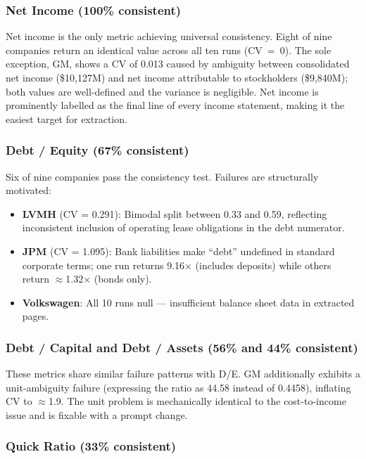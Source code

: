 \documentclass[12pt, a4paper]{article}
\begin{document}
\subsubsection{Net Income (100\% consistent)}

Net income is the only metric achieving universal consistency.  Eight of nine
companies return an identical value across all ten runs (CV~=~0).  The sole
exception, GM, shows a CV of 0.013 caused by ambiguity between consolidated
net income (\$10{,}127M) and net income attributable to stockholders
(\$9{,}840M); both values are well-defined and the variance is negligible.
Net income is prominently labelled as the final line of every income statement,
making it the easiest target for extraction.

\subsubsection{Debt / Equity (67\% consistent)}

Six of nine companies pass the consistency test.  Failures are structurally
motivated:
\begin{itemize}[noitemsep]
  \item \textbf{LVMH} (CV = 0.291): Bimodal split between 0.33 and 0.59,
        reflecting inconsistent inclusion of operating lease obligations in
        the debt numerator.
  \item \textbf{JPM} (CV = 1.095): Bank liabilities make ``debt'' undefined
        in standard corporate terms; one run returns 9.16$\times$ (includes
        deposits) while others return $\approx$1.32$\times$ (bonds only).
  \item \textbf{Volkswagen}: All 10 runs null --- insufficient balance sheet
        data in extracted pages.
\end{itemize}

\subsubsection{Debt / Capital and Debt / Assets (56\% and 44\% consistent)}

These metrics share similar failure patterns with D/E.  GM additionally
exhibits a unit-ambiguity failure (expressing the ratio as 44.58 instead of
0.4458), inflating CV to $\approx$1.9.  The unit problem is mechanically
identical to the cost-to-income issue and is fixable with a prompt change.

\subsubsection{Quick Ratio (33\% consistent)}
\end{document}
